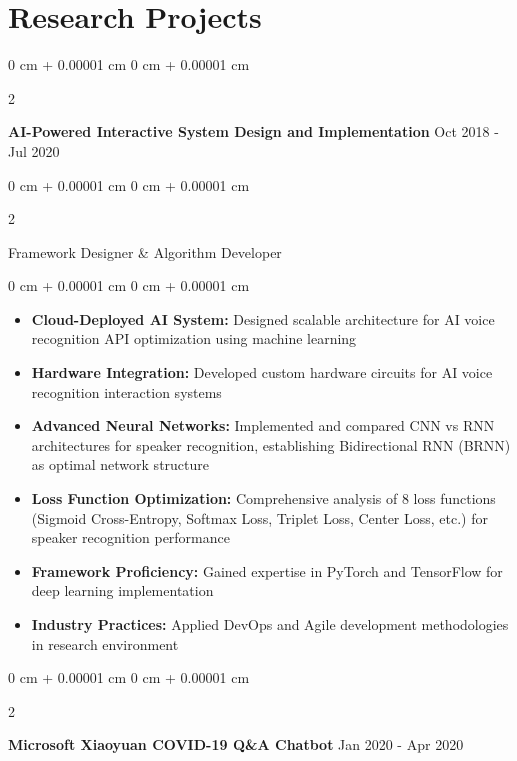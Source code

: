 \documentclass[10pt, a4paper]{article}
\newenvironment{highlights}{
    \begin{itemize}[
        topsep=0.15 cm,
        parsep=0.08 cm,
        partopsep=0pt,
        itemsep=0.05 cm,
        leftmargin=0 cm + 10pt
    ]
}{
    \end{itemize}
} %
\newenvironment{onecolentry}{
    \begin{adjustwidth}{
        0 cm + 0.00001 cm
    }{
        0 cm + 0.00001 cm
    }
}{
    \end{adjustwidth}
} %
\newenvironment{twocolentry}[2][]{
    \onecolentry
    \def\secondColumn{#2}
    \setcolumnwidth{\fill, 4.5 cm}
    \begin{paracol}{2}
}{
    \switchcolumn \raggedleft \secondColumn
    \end{paracol}
    \endonecolentry
} %
\begin{document}
    
    \section{Research Projects}

        \begin{twocolentry}{
            Oct 2018 - Jul 2020
        }
            \textbf{AI-Powered Interactive System Design and Implementation}\end{twocolentry}

        \begin{twocolentry}{
            
        }
            Framework Designer \& Algorithm Developer\end{twocolentry}

        \vspace{0.10 cm}
        \begin{onecolentry}
            \begin{highlights}
                \item \textbf{Cloud-Deployed AI System:} Designed scalable architecture for AI voice recognition API optimization using machine learning
                \item \textbf{Hardware Integration:} Developed custom hardware circuits for AI voice recognition interaction systems
                \item \textbf{Advanced Neural Networks:} Implemented and compared CNN vs RNN architectures for speaker recognition, establishing Bidirectional RNN (BRNN) as optimal network structure
                \item \textbf{Loss Function Optimization:} Comprehensive analysis of 8 loss functions (Sigmoid Cross-Entropy, Softmax Loss, Triplet Loss, Center Loss, etc.) for speaker recognition performance
                \item \textbf{Framework Proficiency:} Gained expertise in PyTorch and TensorFlow for deep learning implementation
                \item \textbf{Industry Practices:} Applied DevOps and Agile development methodologies in research environment
            \end{highlights}
        \end{onecolentry}

        \vspace{0.2 cm}

        \begin{twocolentry}{
            Jan 2020 - Apr 2020
        }
            \textbf{Microsoft Xiaoyuan COVID-19 Q\&A Chatbot}\end{twocolentry}
\end{document}
